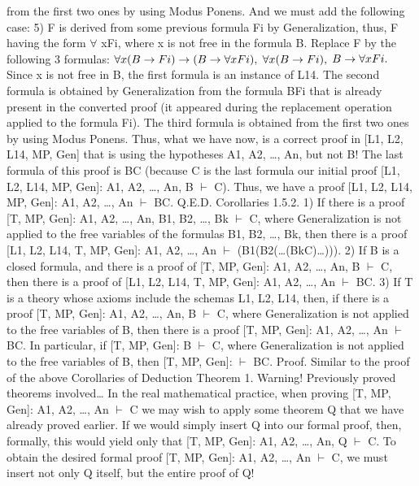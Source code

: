 from the first two ones by using Modus Ponens.
And we must add the following case:
5) F is derived from some previous formula Fi by Generalization, thus, F having the form \(\forall\) xFi, where x
is not free in the formula B. Replace F by the following 3 formulas:
\(\forall x(B\rightarrow Fi)\rightarrow (B\rightarrow \forall xFi),\)
\(\forall x(B\rightarrow Fi),\)
\(B\rightarrow \forall xFi.\)
Since x is not free in B, the first formula is an instance of L14. The second formula is obtained by
Generalization from the formula B\IMPLIES Fi that is already present in the converted proof (it appeared during
the replacement operation applied to the formula Fi). The third formula is obtained from the first two ones
by using Modus Ponens.
Thus, what we have now, is a correct proof in [L1, L2, L14, MP, Gen] that is using the hypotheses A1,
A2, \ldots , An, but not B! The last formula of this proof is B\IMPLIES C (because C is the last formula our initial
proof [L1, L2, L14, MP, Gen]: A1, A2, \ldots , An, B \(\vdash\) C). Thus, we have a proof [L1, L2, L14, MP, Gen]: A1,
A2, \ldots , An \(\vdash\) B\IMPLIES C. Q.E.D.
Corollaries 1.5.2. 1) If there is a proof [T, MP, Gen]: A1, A2, \ldots , An, B1, B2, \ldots , Bk \(\vdash\) C, where
Generalization is not applied to the free variables of the formulas B1, B2, \ldots , Bk, then there is a proof [L1,
L2, L14, T, MP, Gen]: A1, A2, \ldots , An \(\vdash\) (B1\IMPLIES (B2\IMPLIES (\ldots \IMPLIES (Bk\IMPLIES C)\ldots ))).
2) If B is a closed formula, and there is a proof of [T, MP, Gen]: A1, A2, \ldots , An, B \(\vdash\) C, then there is a
proof of [L1, L2, L14, T, MP, Gen]: A1, A2, \ldots , An \(\vdash\) B\IMPLIES C.
3) If T is a theory whose axioms include the schemas L1, L2, L14, then, if there is a proof [T, MP, Gen]:
A1, A2, \ldots , An, B \(\vdash\) C, where Generalization is not applied to the free variables of B, then there is a proof
[T, MP, Gen]: A1, A2, \ldots , An \(\vdash\) B\IMPLIES C. In particular, if [T, MP, Gen]: B \(\vdash\) C, where Generalization is not
applied to the free variables of B, then [T, MP, Gen]: \(\vdash\) B\IMPLIES C.
Proof. Similar to the proof of the above Corollaries of Deduction Theorem 1.
Warning! Previously proved theorems involved\ldots 
In the real mathematical practice, when proving [T, MP, Gen]: A1, A2, \ldots , An \(\vdash\) C we may wish to apply
some theorem Q that we have already proved earlier. If we would simply insert Q into our formal proof,
then, formally, this would yield only that [T, MP, Gen]: A1, A2, \ldots , An, Q \(\vdash\) C. To obtain the desired formal
proof [T, MP, Gen]: A1, A2, \ldots , An \(\vdash\) C, we must insert not only Q itself, but the entire proof of Q!
